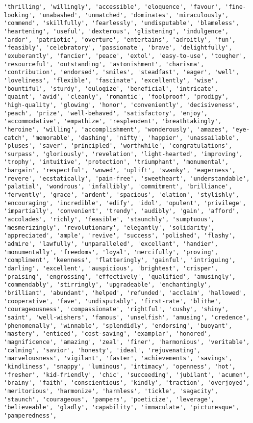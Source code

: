 \documentclass[11pt]{article}
\begin{document}
\begin{Verbatim}[commandchars=\\\{\}]
'thrilling', 'willingly', 'accessible', 'eloquence', 'favour', 'fine-looking', 'unabashed', 'unmatched', 'dominates', 'miraculously', 'commend', 'skillfully', 'fearlessly', 'undisputable', 'blameless', 'heartening', 'useful', 'dexterous', 'glistening', 'indulgence', 'ardor', 'patriotic', 'overture', 'entertains', 'adroitly', 'fun', 'feasibly', 'celebratory', 'passionate', 'brave', 'delightfully', 'exuberantly', 'fancier', 'peace', 'extol', 'easy-to-use', 'tougher', 'resourceful', 'outstanding', 'astonishment', 'charisma', 'contribution', 'endorsed', 'smiles', 'steadfast', 'eager', 'well', 'loveliness', 'flexible', 'fascinate', 'excellently', 'wise', 'bountiful', 'sturdy', 'eulogize', 'beneficial', 'intricate', 'quaint', 'avid', 'cleanly', 'romantic', 'foolproof', 'prodigy', 'high-quality', 'glowing', 'honor', 'conveniently', 'decisiveness', 'peach', 'prize', 'well-behaved', 'satisfactory', 'enjoy', 'accommodative', 'empathize', 'resplendent', 'breathtakingly', 'heroine', 'willing', 'accomplishment', 'wonderously', 'amazes', 'eye-catch', 'memorable', 'dashing', 'nifty', 'happier', 'unassailable', 'pluses', 'saver', 'principled', 'worthwhile', 'congratulations', 'surpass', 'gloriously', 'revelation', 'light-hearted', 'improving', 'trophy', 'intuitive', 'protection', 'triumphant', 'monumental', 'bargain', 'respectful', 'wowed', 'uplift', 'swanky', 'eagerness', 'revere', 'ecstatically', 'pain-free', 'sweetheart', 'understandable', 'palatial', 'wondrous', 'infallibly', 'commitment', 'brilliance', 'fervently', 'grace', 'ardent', 'spacious', 'elation', 'stylishly', 'encouraging', 'incredible', 'edify', 'idol', 'opulent', 'privilege', 'impartially', 'convenient', 'trendy', 'audibly', 'gain', 'afford', 'accolades', 'richly', 'feasible', 'staunchly', 'sumptuous', 'mesmerizingly', 'revolutionary', 'elegantly', 'solidarity', 'appreciated', 'ample', 'revive', 'success', 'polished', 'flashy', 'admire', 'lawfully', 'unparalleled', 'excellant', 'handier', 'monumentally', 'freedoms', 'loyal', 'mercifully', 'proving', 'compliment', 'keenness', 'flatteringly', 'gainful', 'intriguing', 'darling', 'excellent', 'auspicious', 'brightest', 'crisper', 'praising', 'engrossing', 'effectively', 'qualified', 'amusingly', 'commendably', 'stirringly', 'upgradeable', 'enchantingly', 'brilliant', 'abundant', 'helped', 'refunded', 'acclaim', 'hallowed', 'cooperative', 'fave', 'undisputably', 'first-rate', 'blithe', 'courageousness', 'compassionate', 'rightful', 'cushy', 'shiny', 'saint', 'well-wishers', 'famous', 'unselfish', 'amusing', 'credence', 'phenomenally', 'winnable', 'splendidly', 'endorsing', 'buoyant', 'mastery', 'enticed', 'cost-saving', 'examplar', 'honored', 'magnificence', 'amazing', 'zeal', 'finer', 'harmonious', 'veritable', 'calming', 'savior', 'honesty', 'ideal', 'rejuvenating', 'marvelousness', 'vigilant', 'faster', 'achievements', 'savings', 'kindliness', 'snappy', 'luminous', 'intimacy', 'openness', 'hot', 'fresher', 'kid-friendly', 'chic', 'succeeding', 'jubilant', 'acumen', 'brainy', 'faith', 'conscientious', 'kindly', 'traction', 'overjoyed', 'meritorious', 'harmonize', 'harmless', 'tickle', 'sagacity', 'staunch', 'courageous', 'pampers', 'poeticize', 'leverage', 'believeable', 'gladly', 'capability', 'immaculate', 'picturesque', 'pamperedness', 
\end{Verbatim}
\end{document}
